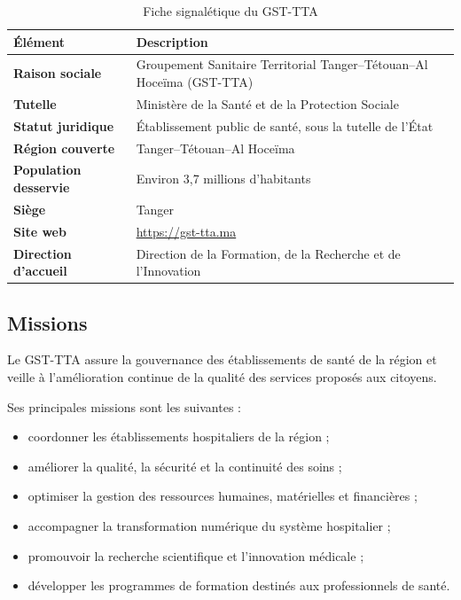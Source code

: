 \begin{table}[H]
\centering
{}
\begin{tabularx}{\textwidth}{>{\bfseries}p{4cm}X}
\toprule
\rowcolor{TableHeader}
\color{white}Élément & \color{white}Description \\
\midrule
Raison sociale & Groupement Sanitaire Territorial Tanger--Tétouan--Al Hoceïma (GST-TTA) \\
Tutelle & Ministère de la Santé et de la Protection Sociale \\
Statut juridique & Établissement public de santé, sous la tutelle de l'État \\
Région couverte & Tanger--Tétouan--Al Hoceïma \\
Population desservie & Environ 3,7 millions d'habitants \\
Siège & Tanger \\
Site web & \url{https://gst-tta.ma} \\
Direction d'accueil & Direction de la Formation, de la Recherche et de l'Innovation \\
\bottomrule
\end{tabularx}
\caption{Fiche signalétique du GST-TTA}
\label{tab:gst}
\end{table}

\subsection{Missions}

Le GST-TTA assure la gouvernance des établissements de santé de la région et veille à l'amélioration continue de la qualité des services proposés aux citoyens.

Ses principales missions sont les suivantes :

\begin{itemize}
  \item coordonner les établissements hospitaliers de la région ;
  \item améliorer la qualité, la sécurité et la continuité des soins ;
  \item optimiser la gestion des ressources humaines, matérielles et financières ;
  \item accompagner la transformation numérique du système hospitalier ;
  \item promouvoir la recherche scientifique et l'innovation médicale ;
  \item développer les programmes de formation destinés aux professionnels de santé.
\end{itemize}

